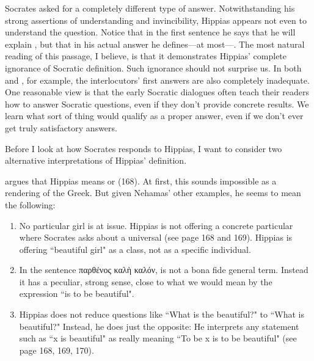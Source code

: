 \documentclass[11pt]{article}
\begin{document}
Socrates asked for a completely different type of answer.  Notwithstanding
his strong assertions of understanding and invincibility, Hippias appears
not even to understand the question.  Notice that in the first sentence he
says that he will explain , but that in his actual answer
he defines---at most---.  The most natural reading of
this passage, I believe, is that it demonstrates Hippias' complete
ignorance of Socratic definition.  Such ignorance should not surprise us.
In both  and , for example, the interlocutors'
first answers are also completely inadequate.  One reasonable view is that
the early Socratic dialogues often teach their readers how to answer
Socratic questions, even if they don't provide concrete results.  We learn
what sort of thing would qualify as a proper answer, even if we don't ever
get truly satisfactory answers.

Before I look at how Socrates responds to Hippias, I want to consider two
alternative interpretations of Hippias' definition.

\citet{nehamas1975a} argues that Hippias means  or  (168).  At first, this sounds impossible as
a rendering of the Greek.  But given Nehamas' other examples, he seems to
mean the following:

\begin{enumerate}

    \item No particular girl is at issue.  Hippias is not offering
        a concrete particular where Socrates asks about a universal (see
        page 168 and
        169).  Hippias is offering ``beautiful girl" as a class, not as
        a specific individual.

    \item In the sentence {\g παρθένος καλὴ καλόν},  is not
        a bona fide general term. Instead it has a peculiar, strong sense,
        close to what we would mean by the expression ``is to be
        beautiful".

    \item Hippias does not reduce questions like ``What is the beautiful?"
        to ``What is beautiful?"  Instead, he does just the opposite: He
        interprets any statement such as ``x is beautiful" as really
        meaning ``To be x is to be beautiful" (see page 168, 169, 170).

\end{enumerate}
\end{document}
